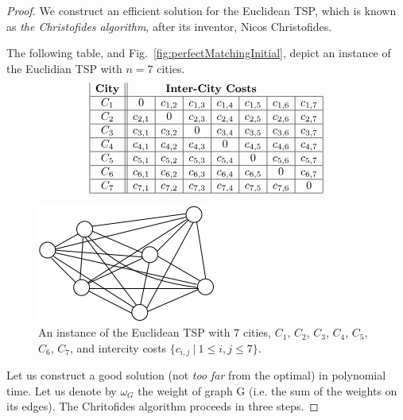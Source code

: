 \begin{proof}
We construct an efficient solution for the Euclidean TSP, which is
known as {\it the Christofides algorithm},  
after its inventor, Nicos Christofides.
\cite{Christofides76}

The following table, and Fig.~\ref{fig:perfectMatchingInitial}, depict
an instance of the Euclidian TSP with $n=7$ cities.
\[
\begin{array}{|c||c|c|c|c|c|c|c|}
\mbox{\bf City} & \multicolumn{6}{c}{\mbox{\bf Inter-City Costs}} \\
\hline
C_1 & 0 & c_{1,2} & c_{1,3} & c_{1,4} & c_{1,5} & c_{1,6} & c_{1,7} \\
\hline
C_2 & c_{2,1} & 0 & c_{2,3} & c_{2,4} & c_{2,5} & c_{2,6} & c_{2,7} \\
\hline
C_3 & c_{3,1} & c_{3,2} & 0 & c_{3,4} & c_{3,5} & c_{3,6} & c_{3,7} \\
\hline
C_4 & c_{4,1} & c_{4,2} & c_{4,3} & 0 & c_{4,5} & c_{4,6} & c_{4,7} \\
\hline
C_5 & c_{5,1} & c_{5,2} & c_{5,3} & c_{5,4} & 0 & c_{5,6} & c_{5,7} \\
\hline
C_6 & c_{6,1} & c_{6,2} & c_{6,3} & c_{6,4} & c_{6,5} & 0 & c_{6,7} \\
\hline
C_7 & c_{7,1} & c_{7,2} & c_{7,3} & c_{7,4} & c_{7,5} & c_{7,6} & 0 \\
\hline
\end{array}
\]


\begin{figure}[hbt]
\begin{center}
       \includegraphics[scale=0.8]{FiguresGraph/christofides1}
\caption{An instance of the Euclidean TSP with $7$ cities, $C_1$,
  $C_2$, $C_3$, $C_4$, $C_5$, $C_6$, $C_7$, and intercity costs
  $\{c_{i,j} \ | \ 1 \leq i,j \leq 7\}$.}
              \label{fig:christofidesInitial}
\end{center}
\end{figure}


Let us construct a good solution (not \textit{too far} from the optimal) in polynomial time. 
Let us denote by $\omega_G$ the weight of graph G (i.e. the sum of the weights on its edges). 
The Chritofides algorithm proceeds in three steps. 
\bigskip


\end{proof}
